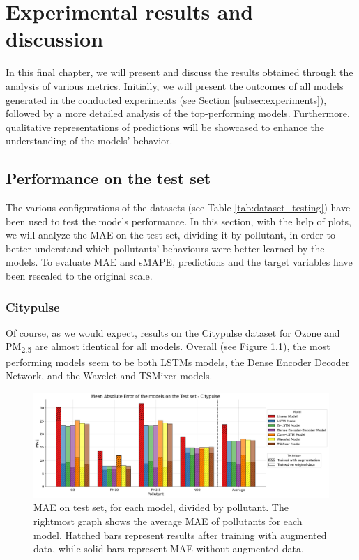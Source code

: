 \chapter{Experimental results and discussion}
\label{chap:results}

In this final chapter, we will present and discuss the results obtained through the analysis of various metrics. Initially, we will present the outcomes of all models generated in the conducted experiments (see Section \ref{subsec:experiments}), followed by a more detailed analysis of the top-performing models. 
Furthermore, qualitative representations of predictions will be showcased to enhance the understanding of the models' behavior.



\section{Performance on the test set}
The various configurations of the datasets (see Table \ref{tab:dataset_testing}) have been used to test the models performance.
In this section, with the help of plots, we will analyze the MAE on the test set, dividing it by pollutant, in order to better understand which pollutants' behaviours were better learned  by the models. To evaluate MAE and sMAPE, predictions and the target variables have been rescaled to the original scale.

\subsection{Citypulse}

Of course, as we would expect, results on the Citypulse dataset for Ozone and PM\textsubscript{2.5} are almost identical for all models.
Overall (see Figure \ref{fig:aarhus_results}), the most performing models seem to be both LSTMs models, the Dense Encoder Decoder Network, and the Wavelet and TSMixer models. 


\begin{figure}[h]
    \centering
    \includegraphics[width=1\linewidth]{images/Aarhus_results.png}
    \caption{MAE on test set, for each model, divided by pollutant. The rightmost graph shows the average MAE of pollutants for each model. Hatched bars represent results after training with augmented data, while solid bars represent MAE without augmented data.}
    \label{fig:aarhus_results}
\end{figure}

